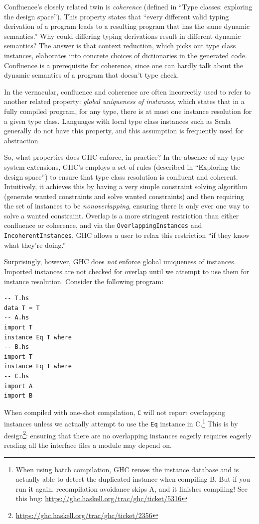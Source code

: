 \documentclass{article}
\begin{document}
Confluence's closely related twin is \emph{coherence} (defined in ``Type
classes: exploring the design space''). This property states that
``every different valid typing derivation of a program leads to a
resulting program that has the same dynamic semantics.''  Why could
differing typing derivations result in different dynamic semantics?  The
answer is that context reduction, which picks out type class instances,
elaborates into concrete choices of dictionaries in the generated code.
Confluence is a prerequisite for coherence, since one
can hardly talk about the dynamic semantics of a program that doesn't
type check.

In the vernacular, confluence and coherence are often incorrectly used
to refer to another related property: \emph{global uniqueness of instances},
which states that in a fully compiled program, for any type, there is at most one
instance resolution for a given type class.  Languages with local type
class instances such as Scala generally do not have this property, and
this assumption is frequently used for abstraction.

So, what properties does GHC enforce, in practice?
In the absence of any type system extensions, GHC's employs a set of
rules (described in ``Exploring the design space'') to ensure that type
class resolution is confluent and coherent.  Intuitively, it achieves
this by having a very simple constraint solving algorithm (generate
wanted constraints and solve wanted constraints) and then requiring the
set of instances to be \emph{nonoverlapping}, ensuring there is only
ever one way to solve a wanted constraint.  Overlap is a
more stringent restriction than either confluence or coherence, and
via the \verb|OverlappingInstances| and \verb|IncoherentInstances|, GHC
allows a user to relax this restriction ``if they know what they're doing.''

Surprisingly, however, GHC does \emph{not} enforce global uniqueness of
instances.  Imported instances are not checked for overlap until we
attempt to use them for instance resolution.  Consider the following program:

\begin{verbatim}
-- T.hs
data T = T
-- A.hs
import T
instance Eq T where
-- B.hs
import T
instance Eq T where
-- C.hs
import A
import B
\end{verbatim}

When compiled with one-shot compilation, \verb|C| will not report
overlapping instances unless we actually attempt to use the \verb|Eq|
instance in C.\footnote{When using batch compilation, GHC reuses the
    instance database and is actually able to detect the duplicated
    instance when compiling B.  But if you run it again, recompilation
avoidance skips A, and it finishes compiling!  See this bug:
\url{https://ghc.haskell.org/trac/ghc/ticket/5316}}  This is by
design\footnote{\url{https://ghc.haskell.org/trac/ghc/ticket/2356}}:
ensuring that there are no overlapping instances eagerly requires
eagerly reading all the interface files a module may depend on.
\end{document}
